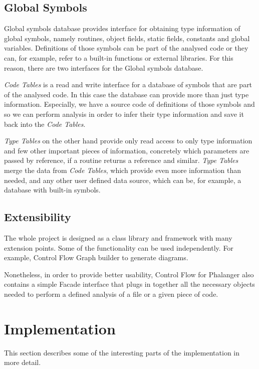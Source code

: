     \subsection{Global Symbols}
    Global symbols database provides interface for 
    obtaining type information of global symbols, 
    namely routines, object fields, static fields, constants 
    and global variables. Definitions of those symbols can be 
    part of the analysed code or they can, for example, refer 
    to a built-in functions or external libraries. 
    For this reason, there are two interfaces 
    for the Global symbols database. 
    
    \emph{Code Tables} is a read and write interface for 
    a database of symbols that are part of the analysed code.     
    In this case the database can provide more than just type 
    information. Especially, we have a source code of definitions 
    of those symbols and so we can perform analysis in order to 
    infer their type information and save it back into 
    the \emph{Code Tables}.
    
    \emph{Type Tables} on the other hand provide only read
    access to only type information and few other important 
    pieces of information, concretely which parameters are 
    passed by reference, if a routine returns a reference 
    and similar. \emph{Type Tables} merge the data from 
    \emph{Code Tables}, which provide even more information 
    than needed, and any other user defined data source, 
    which can be, for example, a database with built-in symbols.    
        
    \subsection{Extensibility}
    The whole project is designed as a class library and 
    framework with many extension points. Some of the 
    functionality can be used independently. For example, 
    Control Flow Graph builder to generate diagrams.
    
    Nonetheless, in order to provide better usability, 
    Control Flow for Phalanger also contains 
    a simple Facade interface that plugs in together all 
    the necessary objects needed to perform a defined 
    analysis of a file or a given piece of code.
    
    \section{Implementation}
    \label{impl}
    This section describes some of the interesting parts of the 
    implementation in more detail.
    
